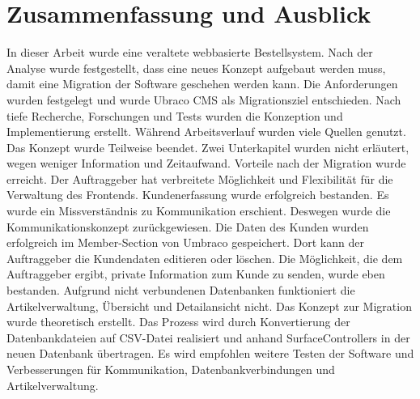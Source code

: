 \chapter{Zusammenfassung und Ausblick}

In dieser Arbeit wurde eine veraltete webbasierte Bestellsystem. Nach der Analyse wurde festgestellt, dass eine neues Konzept aufgebaut werden muss, damit eine Migration der Software geschehen werden kann. Die Anforderungen wurden festgelegt und wurde Ubraco CMS als Migrationsziel entschieden. Nach tiefe Recherche, Forschungen und Tests wurden die Konzeption und Implementierung erstellt. Während Arbeitsverlauf wurden viele Quellen genutzt. Das Konzept wurde Teilweise beendet. Zwei Unterkapitel wurden nicht erläutert, wegen weniger Information und Zeitaufwand. Vorteile nach der Migration wurde erreicht. Der Auftraggeber hat verbreitete Möglichkeit und Flexibilität für die Verwaltung des Frontends. Kundenerfassung wurde erfolgreich bestanden. Es wurde ein Missverständnis zu Kommunikation erschient. Deswegen wurde die Kommunikationskonzept zurückgewiesen. Die Daten des Kunden wurden erfolgreich im Member-Section von Umbraco gespeichert. Dort kann der Auftraggeber die Kundendaten editieren oder löschen. Die Möglichkeit, die dem Auftraggeber ergibt, private Information zum Kunde zu senden, wurde eben bestanden. Aufgrund nicht verbundenen Datenbanken funktioniert die Artikelverwaltung, Übersicht und Detailansicht nicht.
Das Konzept zur Migration wurde theoretisch erstellt. Das Prozess wird durch Konvertierung der Datenbankdateien auf CSV-Datei realisiert und anhand SurfaceControllers in der neuen Datenbank übertragen. Es wird empfohlen weitere Testen der Software und Verbesserungen für Kommunikation, Datenbankverbindungen und Artikelverwaltung.